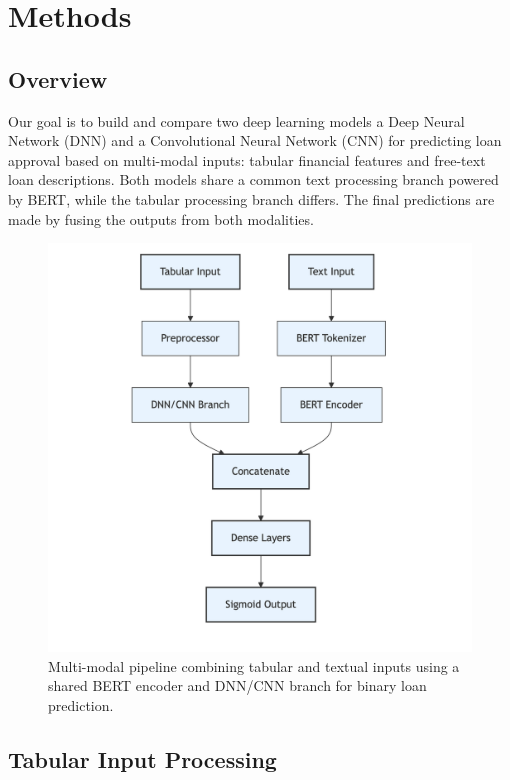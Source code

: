 \section{Methods}

\subsection{Overview}

Our goal is to build and compare two deep learning models a Deep Neural Network (DNN) and a Convolutional Neural Network (CNN) for predicting loan approval based on multi-modal inputs: tabular financial features and free-text loan descriptions. Both models share a common text processing branch powered by BERT, while the tabular processing branch differs. The final predictions are made by fusing the outputs from both modalities.

\begin{figure}[h]
    \centering
    \includegraphics[width=0.85\linewidth]{figures/project_flowchart.png}
    \caption{Multi-modal pipeline combining tabular and textual inputs using a shared BERT encoder and DNN/CNN branch for binary loan prediction.}
    
    \label{fig:flowchart}
\end{figure}

\subsection{Tabular Input Processing}

